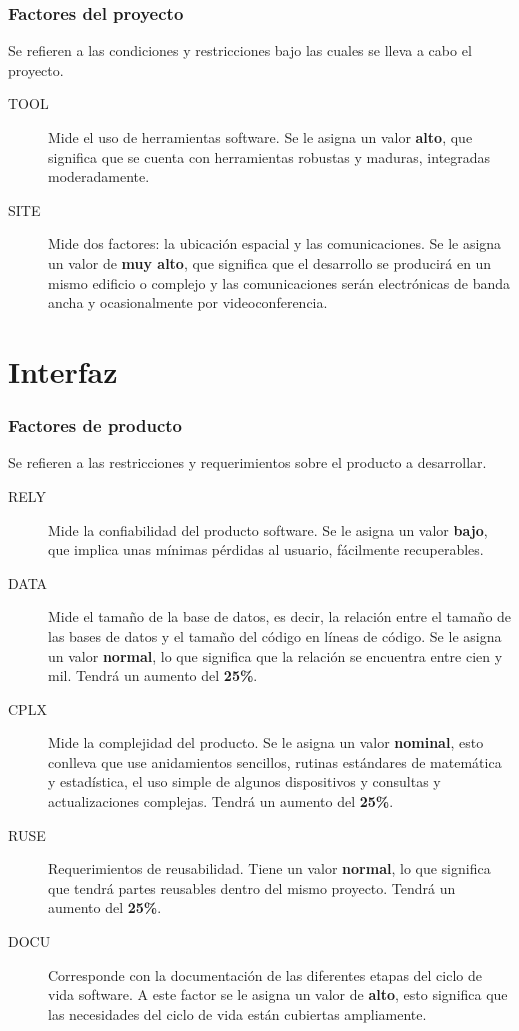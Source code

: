 \documentclass[11pt,a4paper,spanish,twoside]{book}
\begin{document}
\subsubsection{Factores del proyecto}
Se refieren a las condiciones y restricciones bajo las cuales se lleva a cabo
el proyecto.
\begin{description}
\item[TOOL] Mide el uso de herramientas software. Se le asigna un valor
\textbf{alto}, que significa que se cuenta con herramientas robustas y
maduras, integradas moderadamente.
\item[SITE] Mide dos factores: la ubicación espacial y las comunicaciones.
Se le asigna un valor de \textbf{muy alto}, que significa que el desarrollo
se producirá en un mismo edificio o complejo y las comunicaciones serán
electrónicas de banda ancha y ocasionalmente por videoconferencia.
\end{description}

\section{Interfaz}
\subsubsection{Factores de producto}
Se refieren a las restricciones y requerimientos sobre el producto a
desarrollar.
\begin{description}
\item[RELY] Mide la confiabilidad del producto software. Se le asigna un 
valor \textbf{bajo}, que implica unas mínimas pérdidas al usuario,
fácilmente recuperables.

\item[DATA] Mide el tamaño de la base de datos, es decir, la relación entre
el tamaño de las bases de datos y el tamaño del código en líneas de código. Se
le asigna un valor \textbf{normal}, lo que significa que la relación se
encuentra entre cien y mil. Tendrá un aumento del \textbf{25\%}. 

\item[CPLX] Mide la complejidad del producto. Se le asigna un
valor \textbf{nominal}, esto conlleva que use anidamientos sencillos, rutinas
estándares de matemática y estadística, el uso simple de algunos dispositivos
y consultas y actualizaciones complejas. Tendrá un aumento del 
\textbf{25\%}.

\item[RUSE] Requerimientos de reusabilidad. Tiene un valor \textbf{normal},
lo que significa que tendrá partes reusables dentro del mismo
proyecto. Tendrá un aumento del \textbf{25\%}.

\item[DOCU] Corresponde con la documentación de las diferentes etapas del
ciclo de vida software. A este factor se le asigna un valor de \textbf{alto},
esto significa que las necesidades del ciclo de vida están cubiertas
ampliamente.

\end{description}
\end{document}
